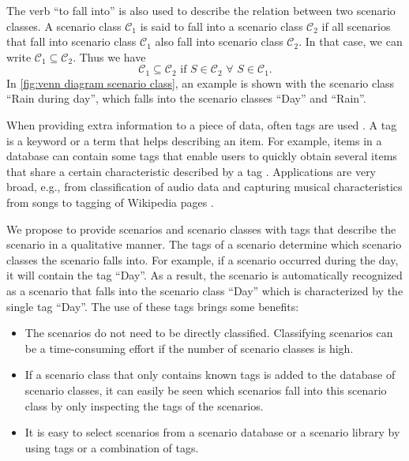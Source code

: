 The verb ``to fall into'' is also used to describe the relation between two scenario classes. A scenario class $\mathcal{C}_1$ is said to fall into a scenario class $\mathcal{C}_2$ if all scenarios that fall into scenario class $\mathcal{C}_1$ also fall into scenario class $\mathcal{C}_2$. In that case, we can write $\mathcal{C}_1 \subseteq \mathcal{C}_2$. Thus we have
\begin{equation}
	\mathcal{C}_1 \subseteq \mathcal{C}_2 \text{ if } S \in \mathcal{C}_2 \,\,\forall\,\, S \in \mathcal{C}_1.
\end{equation}
In \cref{fig:venn diagram scenario class}, an example is shown with the scenario class ``Rain during day'', which falls into the scenario classes ``Day'' and ``Rain''.

When providing extra information to a piece of data, often tags are used \cite{smith2007tagging}. A tag is a keyword or a term that helps describing an item. For example, items in a database can contain some tags that enable users to quickly obtain several items that share a certain characteristic described by a tag \cite{craft2004tagging, vasquez2019controlling}. Applications are very broad, e.g., from classification of audio data \cite{kong2017joint} and capturing musical characteristics from songs \cite{ellis2011semantic} to tagging of Wikipedia pages \cite{voss2006collaborative}.

We propose to provide scenarios and scenario classes with tags that describe the scenario in a qualitative manner. The tags of a scenario determine which scenario classes the scenario falls into. For example, if a scenario occurred during the day, it will contain the tag ``Day''. As a result, the scenario is automatically recognized as a scenario that falls into the scenario class ``Day'' which is characterized by the single tag ``Day''. The use of these tags brings some benefits:
\begin{itemize}
	\item The scenarios do not need to be directly classified. Classifying scenarios can be a time-consuming effort if the number of scenario classes is high.
	\item If a scenario class that only contains known tags is added to the database of scenario classes, it can easily be seen which scenarios fall into this scenario class by only inspecting the tags of the scenarios.
	\item It is easy to select scenarios from a scenario database or a scenario library by using tags or a combination of tags.
\end{itemize}

